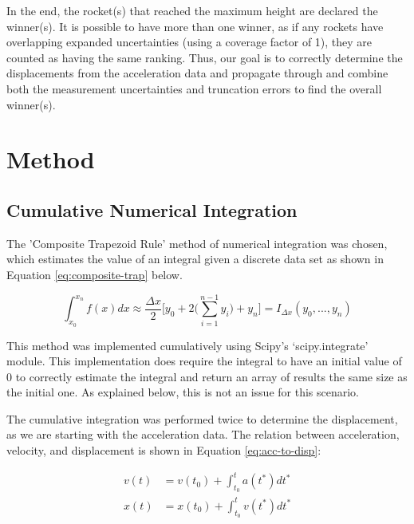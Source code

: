\documentclass{article}
\begin{document}
    In the end, the rocket(s) that reached the maximum height are declared the winner(s). It is possible to have more than one winner, as if any rockets have overlapping expanded uncertainties (using a coverage factor of 1), they are counted as having the same ranking. Thus, our goal is to correctly determine the displacements from the acceleration data and propagate through and combine both the measurement uncertainties and truncation errors to find the overall winner(s).
    
\section*{Method}

    \subsection*{Cumulative Numerical Integration}

         The 'Composite Trapezoid Rule' method of numerical integration was chosen, which estimates the value of an integral given a discrete data set as shown in Equation \ref{eq:composite-trap} below.

        \begin{equation}
            \int^{x_n}_{x_0} f(x) dx \approx \frac{\Delta x}{2} \Biggl[ y_0 + 2\Biggl( \sum^{n -1}_{i = 1} y_i \Biggr) + y_n \Biggr] = I_{\Delta x} (y_0, ..., y_n)
            \label{eq:composite-trap}
        \end{equation}

    This method was implemented cumulatively using Scipy's `scipy.integrate' module. This implementation does require the integral to have an initial value of 0 to correctly estimate the integral and return an array of results the same size as the initial one. As explained below, this is not an issue for this scenario.

    The cumulative integration was performed twice to determine the displacement, as we are starting with the acceleration data. The relation between acceleration, velocity, and displacement is shown in Equation \ref{eq:acc-to-disp}:
        
        \begin{equation}
        \begin{split}
            v(t) & = v(t_0) + \int^t_{t_0} a(t^*) dt^* \\
            x(t) & = x(t_0) + \int^t_{t_0} v(t^*) dt^* \\
        \end{split}
        \label{eq:acc-to-disp}
        \end{equation}
\end{document}
